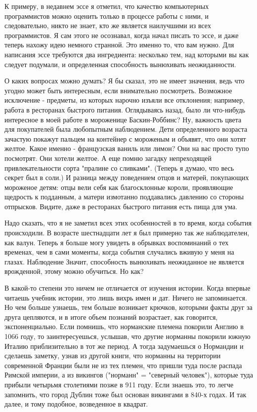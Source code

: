 \documentclass[ebook,12pt,oneside,openany]{memoir}
\begin{document}
К примеру, в недавнем эссе я отметил, что качество компьютерных
программистов можно оценить только в процессе работы с ними, и
следовательно, никто не знает, кто же является наилучшими из всех
программистов. Я сам этого не осознавал, когда начал писать то эссе, и
даже теперь нахожу идею немного странной. Это именно то, что вам
нужно. Для написания эссе требуются два ингредиента: несколько тем,
над которыми вы как следует подумали, и определенная способность
вынюхивать неожиданности.

О каких вопросах можно думать? Я бы сказал, это не имеет значения,
ведь что угодно может быть интересным, если внимательно посмотреть.
Возможное исключение - предметы, из которых нарочно изъяли все
отклонения; например, работа в ресторанах быстрого питания.
Оглядываясь назад, было ли что-нибудь интересное в моей работе в
мороженице Баскин-Роббинс? Ну, важность цвета для покупателей была
любопытным наблюдением. Дети определенного возраста зачастую покажут
пальцем на контейнер с мороженым и объявят, что они хотят желтое.
Какое именно - французская ваниль или лимон? Они на вас просто тупо
посмотрят. Они хотели желтое. А еще помню загадку непреходящей
привлекательности сорта "пралине со сливками". (Теперь я думаю, что
весь секрет был в соли.) И разница между поведением отцов и матерей,
покупающих мороженое детям: отцы вели себя как благосклонные короли,
проявляющие щедрость к подданным, а матери измотанно поддавались
давлению со стороны отпрысков. Видите, даже в ресторанах быстрого
питания есть пища для ума.

Надо сказать, что я не заметил всех этих особенностей в то время,
когда события происходили. В возрасте шестнадцати лет я был примерно
так же наблюдателен, как валун. Теперь я больше могу увидеть в
обрывках воспоминаний о тех временах, чем в сами моменты, когда
события случались вживую у меня на глазах. Наблюдение Значит,
способность вынюхивать неожиданное не является врожденной, этому можно
обучиться. Но как?

В какой-то степени это ничем не отличается от изучения истории. Когда
впервые читаешь учебник истории, это лишь вихрь имен и дат. Ничего не
запоминается. Но чем больше узнаешь, тем больше возникает крючков,
которыми факты друг за друга цепляются, и в итоге объем познаний
возрастает, как говорится, экспоненциально. Если помнишь, что
норманские племена покорили Англию в 1066 году, то заинтересуешься,
услышав, что другие норманны покорили южную Италию приблизительно в
тот же период. А тогда задумаешься о Нормандии и сделаешь заметку,
узнав из другой книги, что норманны на территории современной Франции
были не из тех племен, что пришли туда после распада Римской империи,
а из викингов ("норманн" = "северный человек"), которые туда прибыли
четырьмя столетиями позже в 911 году. Если знаешь это, то легче
запомнить, что город Дублин тоже был основан викингами в 840-х годах.
И так далее, и тому подобное, возведенное в квадрат.
\end{document}
